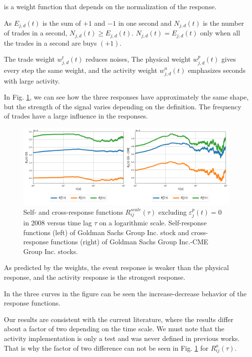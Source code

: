 is a weight function that depends on the normalization of the response.

As $E_{j,d}\left(t\right)$ is the sum of $+1$ and $-1$ in one second and
$N_{j,d}\left(t\right)$ is the number of trades in a second,
$N_{j,d}\left(t\right) \ge E_{j,d}\left(t\right)$.
$N_{j,d}\left(t\right) = E_{j,d}\left(t\right)$ only when all the trades in a
second are buys $(+1)$.

The trade weight $w_{j,d}^{t}\left(t\right)$ reduces noises, The physical
weight $w_{j,d}^{p}\left(t\right)$ gives every step the same weight, and the
activity weight $w_{j,d}^{a}\left(t\right)$ emphasizes seconds with large
activity.

In Fig. \ref{fig:relation_responses}, we can see how the three
responses have approximately the same shape, but the strength of the signal
varies depending on the definition. The frequency of trades have a large
influence in the responses.

\begin{figure}[htbp]
    \centering
    \includegraphics[width=\textwidth]
    {figures/03_response_comparison_2008_GSi_CMEj.png}
    \caption{Self- and cross-response functions
             $R^{scale}_{ij}\left(\tau\right)$ excluding
             $\varepsilon^{p}_{j}\left(t\right) = 0$ in 2008 versus time lag
             $\tau$ on a logarithmic scale. Self-response functions (left) of
             Goldman Sachs Group Inc. stock and cross-response functions
             (right) of Goldman Sachs Group Inc.-CME Group Inc. stocks.}
    \label{fig:relation_responses}
\end{figure}

As predicted by the weights, the event response is weaker than the physical
response, and the activity response is the strongest response.

In the three curves in the figure can be seen the increase-decrease behavior of
the response functions.

Our results are consistent with the current literature, where the results
differ about a factor of two depending on the time scale. We must note that the
activity implementation is only a test and was never defined in previous works.
That is why the factor of two difference can not be seen in Fig.
\ref{fig:relation_responses} for $R_{ij}^{a} \left( \tau \right)$.
